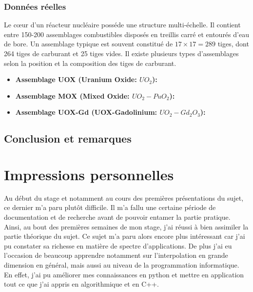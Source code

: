 \subsubsection{Données réelles}
Le cœur d'un réacteur nucléaire posséde une structure multi-échelle. Il contient entre 150-200 assemblages combustibles disposés en treillis carré
et entourés d'eau de bore. Un assemblage typique est souvent constitué de $17 \times 17=289$ tiges, dont 264 tiges de carburant et 25 tiges vides.
Il existe plusieurs types d'assemblages selon la position et la composition des tiges de carburant.
\begin{itemize}
\item \textbf{Assemblage UOX (Uranium Oxide: $UO_2$):}

\item \textbf{Assemblage MOX (Mixed Oxide: $UO_2-PuO_2$):}

\item \textbf{Assemblage UOX-Gd (UOX-Gadolinium: $UO_2-Gd_2O_3$):}

\end{itemize}

\subsection{Conclusion et remarques}

\section{Impressions personnelles}\label{sec:7}
\hspace{0.5cm}
Au début du stage et notamment au cours des premières présentations du sujet, ce dernier m'a paru
plutôt difficile. Il m'a fallu une certaine période de documentation et de recherche avant de pouvoir entamer la partie pratique.
Ainsi, au bout des premières semaines de mon stage, j'ai réussi à bien assimiler la partie théorique du sujet.
Ce sujet m'a paru alors encore plus intéressant car j'ai pu constater sa richesse en matière de spectre d'applications. De plus j'ai eu l'occasion
de beaucoup apprendre notamment sur l'interpolation en grande dimension en général, mais aussi au niveau de la programmation informatique. En effet, j'ai
pu améliorer mes connaissances en python et mettre en application tout ce que j'ai appris en algorithmique et en C++.\\

